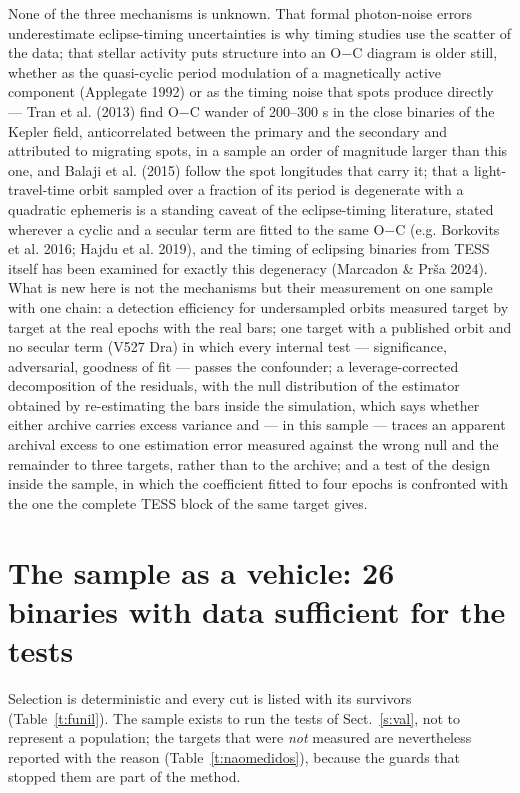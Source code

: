 \documentclass{aa}
\begin{document}
None of the three mechanisms is unknown. That formal photon-noise errors underestimate eclipse-timing uncertainties is why timing studies use the scatter of the data; that stellar activity puts structure into an O$-$C diagram is older still, whether as the quasi-cyclic period modulation of a magnetically active component (Applegate 1992) or as the timing noise that spots produce directly --- Tran et al. (2013) find O$-$C wander of 200--300 s in the close binaries of the Kepler field, anticorrelated between the primary and the secondary and attributed to migrating spots, in a sample an order of magnitude larger than this one, and Balaji et al. (2015) follow the spot longitudes that carry it; that a light-travel-time orbit sampled over a fraction of its period is degenerate with a quadratic ephemeris is a standing caveat of the eclipse-timing literature, stated wherever a cyclic and a secular term are fitted to the same O$-$C (e.g. Borkovits et al. 2016; Hajdu et al. 2019), and the timing of eclipsing binaries from TESS itself has been examined for exactly this degeneracy (Marcadon \& Prša 2024). What is new here is not the mechanisms but their measurement on one sample with one chain: a detection efficiency for undersampled orbits measured target by target at the real epochs with the real bars; one target with a published orbit and no secular term (V527 Dra) in which every internal test --- significance, adversarial, goodness of fit --- passes the confounder; a leverage-corrected decomposition of the residuals, with the null distribution of the estimator obtained by re-estimating the bars inside the simulation, which says whether either archive carries excess variance and --- in this sample --- traces an apparent archival excess to one estimation error measured against the wrong null and the remainder to three targets, rather than to the archive; and a test of the design inside the sample, in which the coefficient fitted to four epochs is confronted with the one the complete TESS block of the same target gives.


\section{The sample as a vehicle: 26 binaries with data sufficient for the tests}\label{s:sel}
Selection is deterministic and every cut is listed with its survivors (Table~\ref{t:funil}). The sample exists to run the tests of Sect.~\ref{s:val}, not to represent a population; the targets that were \textit{not} measured are nevertheless reported with the reason (Table~\ref{t:naomedidos}), because the guards that stopped them are part of the method.
\end{document}
